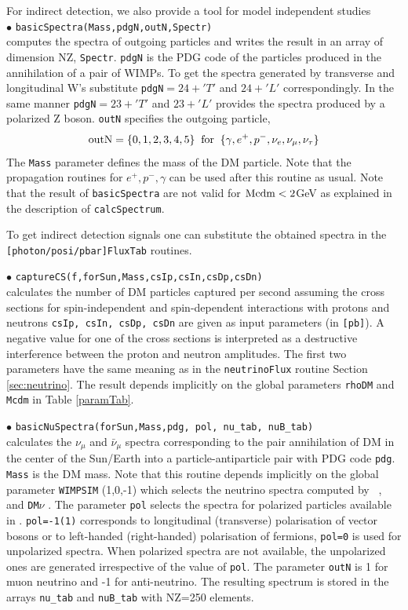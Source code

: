 \documentclass[12pt,a4paper]{article}
\begin{document}
For indirect detection, we also provide a tool for model independent studies\\ 
\noindent
$\bullet$ \verb|basicSpectra(Mass,pdgN,outN,Spectr)|\\
computes the spectra of outgoing particles and writes the result in an array of dimension NZ, \verb|Spectr|.
\verb|pdgN| is the PDG code of the particles produced in the annihilation of a pair of 
WIMPs. To get the spectra generated by transverse and longitudinal W's substitute 
\verb|pdgN|$=24+'T'$ and $24+'L'$ correspondingly. In the same manner \verb|pdgN|$=23+'T'$ and
$23+'L'$  provides the spectra produced by a polarized Z boson.
 \verb|outN|  specifies the outgoing particle,
$$ {\rm outN} = \{0,1,2,3,4,5\} \;\; {\rm for}\;\; \{\gamma,   e^+,  p^-, \nu_e,
\nu_{\mu},\nu_{\tau}\} $$
The {\tt Mass} parameter defines the mass of the DM particle.
Note that the  propagation routines for $e^+,p^-,\gamma$ can be used after 
this routine as usual. Note that the result of {\tt basicSpectra}
are not valid for ${\rm Mcdm} < 2$GeV as explained in the description of {\tt calcSpectrum}.  

To get indirect detection signals one can substitute the obtained spectra in the\\ 
{\tt [photon/posi/pbar]FluxTab} routines.
  

\noindent $\bullet$ \verb|captureCS(f,forSun,Mass,csIp,csIn,csDp,csDn)|\\
calculates the number of DM particles captured per second assuming the cross sections
for  spin-independent and spin-dependent 
interactions with protons and neutrons   {\tt csIp, csIn, csDp, csDn} are
given as input parameters (in {\tt [pb]}). 
A negative value for one of the cross sections  is interpreted as a destructive
interference between the  proton and neutron amplitudes. The first two
parameters have the same meaning as in the {\tt neutrinoFlux} routine Section \ref{sec:neutrino}. The
result  depends implicitly on the global parameters {\tt rhoDM} and {\tt
Mcdm} in Table \ref{paramTab}. 


\noindent
$\bullet$ \verb|basicNuSpectra(forSun,Mass,pdg, pol, nu_tab, nuB_tab) |\\
calculates  the $\nu_{\mu}$   and  $\bar{\nu}_{\mu}$ spectra
corresponding to the pair annihilation of DM in the center of the Sun/Earth
into a particle-antiparticle pair with PDG code {\tt pdg}. \verb|Mass| is the DM mass.
Note that this
routine depends implicitly on the global parameter {\tt WIMPSIM} (1,0,-1) which selects the neutrino spectra computed by
 \wimpsim~\cite{Blennow:2007tw}, \pppc~\cite{Baratella:2013fya} and  {\tt DM$\nu$}
\cite{Cirelli:2005gh}.
The parameter {\tt pol} selects the spectra for  polarized particles available  in
\pppc. {\tt pol=-1(1)} corresponds to longitudinal (transverse) polarisation
of vector bosons or to left-handed (right-handed)  polarisation of  fermions, {\tt pol=0}
is used for unpolarized spectra. When polarized spectra are not available, the unpolarized ones are generated irrespective of the value of \verb|pol|. 
The parameter {\tt outN} is 1 for muon neutrino and -1 for anti-neutrino. The resulting spectrum is stored in the
arrays   \verb|nu_tab| and \verb|nuB_tab| with NZ=250 elements.
\end{document}
